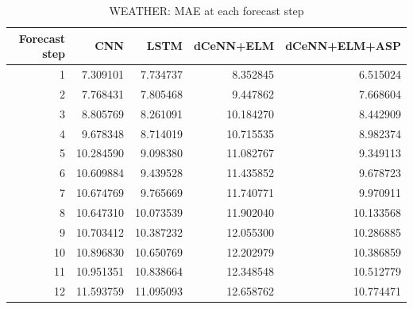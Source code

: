 \begin{table}
\caption{WEATHER: MAE at each forecast step}
\begin{tabular}{rrrrr}
\toprule
Forecast step & CNN & LSTM & dCeNN+ELM & dCeNN+ELM+ASP \\
\midrule
1 & 7.309101 & 7.734737 & 8.352845 & 6.515024 \\
2 & 7.768431 & 7.805468 & 9.447862 & 7.668604 \\
3 & 8.805769 & 8.261091 & 10.184270 & 8.442909 \\
4 & 9.678348 & 8.714019 & 10.715535 & 8.982374 \\
5 & 10.284590 & 9.098380 & 11.082767 & 9.349113 \\
6 & 10.609884 & 9.439528 & 11.435852 & 9.678723 \\
7 & 10.674769 & 9.765669 & 11.740771 & 9.970911 \\
8 & 10.647310 & 10.073539 & 11.902040 & 10.133568 \\
9 & 10.703412 & 10.387232 & 12.055300 & 10.286885 \\
10 & 10.896830 & 10.650769 & 12.202979 & 10.386859 \\
11 & 10.951351 & 10.838664 & 12.348548 & 10.512779 \\
12 & 11.593759 & 11.095093 & 12.658762 & 10.774471 \\
\bottomrule
\end{tabular}
\end{table}
